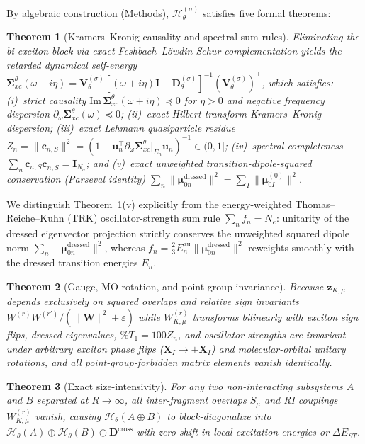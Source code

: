 \documentclass[10pt,twocolumn]{article}
\theoremstyle{natthm}
\newtheorem{theorem}{Theorem}
\newcommand{\dEST}{\Delta E_{ST}}
\newcommand{\Sig}{\mathbf{\Sigma}_{xc}^{\theta}}
\newcommand{\Hlift}{\mathcal{H}_{\theta}^{(\sigma)}}
\newcommand{\pctT}{\mathrm{\%}T_1}
\begin{document}
By algebraic construction (Methods), $\Hlift$ satisfies five formal theorems:

\begin{theorem}[Kramers--Kronig causality and spectral sum rules]
Eliminating the bi-exciton block via exact Feshbach--L\"owdin Schur complementation yields the retarded dynamical self-energy
$\Sig(\omega+i\eta)=\mathbf{V}_\theta^{(\sigma)}[(\omega+i\eta)\mathbf{I}-\mathbf{D}_\theta^{(\sigma)}]^{-1}(\mathbf{V}_\theta^{(\sigma)})^\top$,
which satisfies: (i)~strict causality $\mathrm{Im}\,\Sig(\omega+i\eta)\preceq 0$ for $\eta>0$ and negative frequency dispersion $\partial_\omega\Sig(\omega)\preceq 0$; (ii)~exact Hilbert-transform Kramers--Kronig dispersion; (iii)~exact Lehmann quasiparticle residue $Z_n=\|\mathbf{c}_{n,S}\|^2=(1-\mathbf{u}_n^\top\partial_\omega\Sig|_{E_n}\mathbf{u}_n)^{-1}\in(0,1]$; (iv)~spectral completeness $\sum_n \mathbf{c}_{n,S}\mathbf{c}_{n,S}^\top=\mathbf{I}_{N_\sigma}$; and (v)~exact unweighted transition-dipole-squared conservation (Parseval identity) $\sum_n\|\boldsymbol{\mu}_{0n}^{\mathrm{dressed}}\|^2=\sum_I\|\boldsymbol{\mu}_{0I}^{(0)}\|^2$.
\end{theorem}
We distinguish Theorem~1(v) explicitly from the energy-weighted Thomas--Reiche--Kuhn (TRK) oscillator-strength sum rule $\sum_n f_n = N_e$: unitarity of the dressed eigenvector projection strictly conserves the unweighted squared dipole norm $\sum_n\|\boldsymbol{\mu}_{0n}^{\mathrm{dressed}}\|^2$, whereas $f_n=\frac{2}{3}E_n^{\mathrm{au}}\|\boldsymbol{\mu}_{0n}^{\mathrm{dressed}}\|^2$ reweights smoothly with the dressed transition energies $E_n$.

\begin{theorem}[Gauge, MO-rotation, and point-group invariance]
Because $\mathbf{z}_{K,\mu}$ depends exclusively on squared overlaps and relative sign invariants $W^{(r)}W^{(r')}/(\|\mathbf{W}\|^2+\varepsilon)$ while $W_{K,\mu}^{(r)}$ transforms bilinearly with exciton sign flips, dressed eigenvalues, $\pctT=100Z_n$, and oscillator strengths are invariant under arbitrary exciton phase flips ($\mathbf{X}_I\to\pm\mathbf{X}_I$) and molecular-orbital unitary rotations, and all point-group-forbidden matrix elements vanish identically.
\end{theorem}

\begin{theorem}[Exact size-intensivity]
For any two non-interacting subsystems $A$ and $B$ separated at $R\to\infty$, all inter-fragment overlaps $S_\mu$ and RI couplings $W_{K,\mu}^{(r)}$ vanish, causing $\mathcal{H}_\theta(A\oplus B)$ to block-diagonalize into $\mathcal{H}_\theta(A)\oplus\mathcal{H}_\theta(B)\oplus\mathbf{D}^{\mathrm{cross}}$ with zero shift in local excitation energies or $\dEST$.
\end{theorem}
\end{document}
